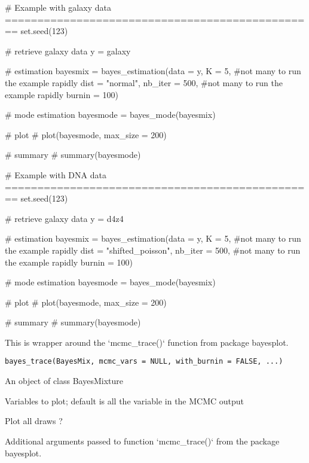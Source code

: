 \documentclass[a4paper]{book}
\begin{document}
%
\begin{Examples}
\begin{ExampleCode}
# Example with galaxy data ================================================
set.seed(123) 

# retrieve galaxy data
y = galaxy

# estimation
bayesmix = bayes_estimation(data = y,
                           K = 5, #not many to run the example rapidly
                           dist = "normal",
                           nb_iter = 500, #not many to run the example rapidly
                           burnin = 100)

# mode estimation
bayesmode = bayes_mode(bayesmix)

# plot 
# plot(bayesmode, max_size = 200)

# summary 
# summary(bayesmode)

# Example with DNA data ================================================
set.seed(123) 

# retrieve galaxy data
y = d4z4

# estimation
bayesmix = bayes_estimation(data = y,
                           K = 5, #not many to run the example rapidly
                           dist = "shifted_poisson",
                           nb_iter = 500, #not many to run the example rapidly
                           burnin = 100)

# mode estimation
bayesmode = bayes_mode(bayesmix)

# plot 
# plot(bayesmode, max_size = 200)

# summary 
# summary(bayesmode)

\end{ExampleCode}
\end{Examples}
%
\begin{Description}\relax
This is wrapper around the `mcmc\_trace()` function from package bayesplot.
\end{Description}
%
\begin{Usage}
\begin{verbatim}
bayes_trace(BayesMix, mcmc_vars = NULL, with_burnin = FALSE, ...)
\end{verbatim}
\end{Usage}
%
\begin{Arguments}
\begin{ldescription}
\item[\code{BayesMix}] An object of class BayesMixture

\item[\code{mcmc\_vars}] Variables to plot; default is all the variable in the MCMC output

\item[\code{with\_burnin}] Plot all draws ?

\item[\code{...}] Additional arguments passed to function `mcmc\_trace()` from the package bayesplot.
\end{ldescription}
\end{Arguments}
\end{document}
